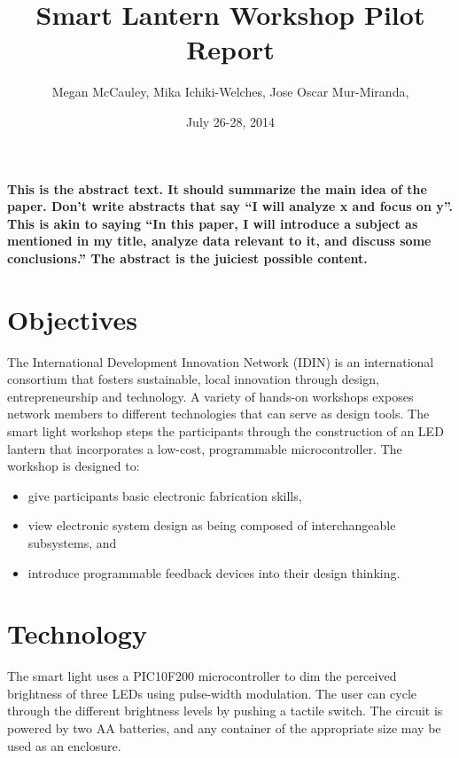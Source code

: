 \documentclass[11pt, twocolumn]{article}
\title{Smart Lantern Workshop Pilot Report} %
\author{Megan McCauley, Mika Ichiki-Welches, Jose Oscar Mur-Miranda, } %
\date{July 26-28, 2014} %
\begin{document}
\maketitle %

\thispagestyle{fancy} %


\noindent \textbf{This is the abstract text. It should summarize the main idea of the paper. Don't write abstracts that say ``I will analyze x and focus on y''. This is akin to saying ``In this paper, I will introduce a subject as mentioned in my title, analyze data relevant to it, and discuss some conclusions.'' The abstract is the juiciest possible content.}


\section*{Objectives}
The International Development Innovation Network (IDIN) is an international consortium that fosters sustainable, local innovation through design, entrepreneurship and technology. A variety of hands-on workshops exposes network members to different technologies that can serve as design tools. The smart light workshop steps the participants through the construction of an LED lantern that incorporates a low-cost, programmable microcontroller.
The workshop is designed to:

\begin{itemize}
\item give participants basic electronic fabrication skills,
\item view electronic system design as being composed of interchangeable subsystems, and
\item introduce programmable feedback devices into their design thinking.
\end{itemize}

\section*{Technology}
The smart light uses a PIC10F200 microcontroller to dim the perceived brightness of three LEDs using pulse-width modulation. The user can cycle through the different brightness levels by pushing a tactile switch. The circuit is powered by two AA batteries, and any container of the appropriate size may be used as an enclosure.
\end{document}
